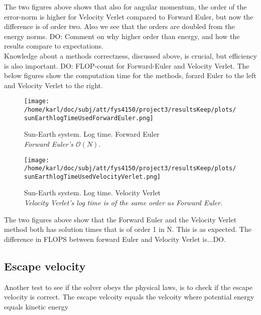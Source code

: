 \documentclass{article}
\begin{document}
The two figures above shows that also for angular momentum, the order of the error-norm is higher for Velocity Verlet compared to Forward Euler, but now the difference is of order two. Also we see that the orders are doubled from the energy norms. DO: Comment on why higher order than energy, and how the results compare to expectations.\\

Knowledge about a methods correctness, discussed above, is crucial, but efficiency is also important. DO: FLOP-count for Forward-Euler and Velocity Verlet. The below figures show the computation time for the methods, forard Euler to the left and Velocity Verlet to the right.

\begin{minipage}{.49\textwidth} 
	\begin{figure}[H]
		\centering
		\texttt{[image: /home/karl/doc/subj/att/fys4150/project3/resultsKeep/plots/sunEarthlogTimeUsedForwardEuler.png]}
		\caption{Sun-Earth system. Log time. Forward Euler \\ \textit{Forward Euler's $\mathcal{O}(N)$}.}
		\label{1}
	\end{figure}
\end{minipage}\hfill
\begin{minipage}{.49\textwidth} 
	\begin{figure}[H]
		\centering
		\texttt{[image: /home/karl/doc/subj/att/fys4150/project3/resultsKeep/plots/sunEarthlogTimeUsedVelocityVerlet.png]}
		\caption{Sun-Earth system. Log time. Velocity Verlet \\ \textit{Velocity Verlet's log time is of the same order as Forward Euler.}}
		\label{1}
	\end{figure}
\end{minipage}\hfill
\vspace{2ex}

The two figures above show that the Forward Euler and the Velocity Verlet method both has solution times that is of order 1 in N. This is as expected. The difference in FLOPS between forward Euler and Velocity Verlet is...DO.


\subsection{Escape velocity}
Another test to see if the solver obeys the physical laws, is to check if the escape velocity is correct. The escape velcoity equals the velcoity where potential energy equals kinetic energy
\end{document}
